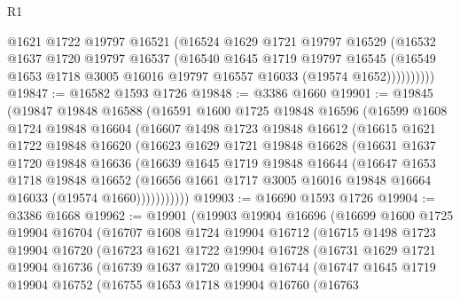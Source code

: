 \begin{lexlean}{R1}
\begin{coremodule}
              @1621
              @1722
              @19797
              @16521
              (@16524
                @1629
                @1721
                @19797
                @16529
                (@16532
                  @1637
                  @1720
                  @19797
                  @16537
                  (@16540
                    @1645
                    @1719
                    @19797
                    @16545
                    (@16549 @1653 @1718 @3005 @16016 @19797 @16557 @16033 (@19574 @1652))))))))))
@19847 := @16582 @1593 @1726
@19848 := @3386 @1660
@19901 := @19845
    (@19847
      @19848
      @16588
      (@16591
        @1600
        @1725
        @19848
        @16596
        (@16599
          @1608
          @1724
          @19848
          @16604
          (@16607
            @1498
            @1723
            @19848
            @16612
            (@16615
              @1621
              @1722
              @19848
              @16620
              (@16623
                @1629
                @1721
                @19848
                @16628
                (@16631
                  @1637
                  @1720
                  @19848
                  @16636
                  (@16639
                    @1645
                    @1719
                    @19848
                    @16644
                    (@16647
                      @1653
                      @1718
                      @19848
                      @16652
                      (@16656 @1661 @1717 @3005 @16016 @19848 @16664 @16033 (@19574 @1660)))))))))))
@19903 := @16690 @1593 @1726
@19904 := @3386 @1668
@19962 := @19901
    (@19903
      @19904
      @16696
      (@16699
        @1600
        @1725
        @19904
        @16704
        (@16707
          @1608
          @1724
          @19904
          @16712
          (@16715
            @1498
            @1723
            @19904
            @16720
            (@16723
              @1621
              @1722
              @19904
              @16728
              (@16731
                @1629
                @1721
                @19904
                @16736
                (@16739
                  @1637
                  @1720
                  @19904
                  @16744
                  (@16747
                    @1645
                    @1719
                    @19904
                    @16752
                    (@16755
                      @1653
                      @1718
                      @19904
                      @16760
                      (@16763

\end{coremodule}
\end{lexlean}

